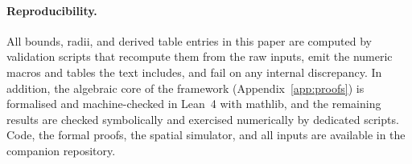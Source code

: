 \paragraph{Reproducibility.} All bounds, radii, and derived table entries in this paper are computed by validation scripts that recompute them from the raw inputs, emit the numeric macros and tables the text includes, and fail on any internal discrepancy. In addition, the algebraic core of the framework (Appendix~\ref{app:proofs}) is formalised and machine-checked in Lean~4 with mathlib, and the remaining results are checked symbolically and exercised numerically by dedicated scripts. Code, the formal proofs, the spatial simulator, and all inputs are available in the companion repository.
